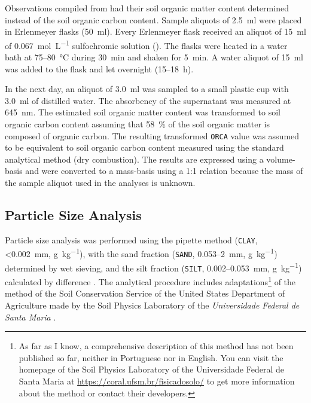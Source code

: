 Observations compiled from \citet{Pedron2005} had their soil organic matter content determined instead of the 
soil organic carbon content. Sample aliquots of \SI{2.5}{\ml} were placed in Erlenmeyer flasks (\SI{50}{\ml}). 
Every Erlenmeyer flask received an aliquot of \SI{15}{\ml} of \SI{0.067}{\mole\per\liter} sulfochromic 
solution (). The flasks were heated in a water bath at 75--\SI{80}{\celsius} during 
\SI{30}{\minute} and shaken for \SI{5}{\minute}. A water aliquot of \SI{15}{\ml} was added to the flask and 
let overnight (15--\SI{18}{\hour}).

In the next day, an aliquot of \SI{3.0}{\ml} was sampled to a small plastic cup with \SI{3.0}{\ml} of 
distilled water. The absorbency of the supernatant was measured at \SI{645}{\nano\metre}. The estimated soil 
organic matter content was transformed to soil organic carbon content assuming that \SI{58}{\percent} of the 
soil organic matter is composed of organic carbon. The resulting transformed \texttt{ORCA} value was assumed 
to be equivalent to soil organic carbon content measured using the standard analytical method (dry 
combustion). The results are expressed using a volume-basis and were converted to a mass-basis using a 1:1 
relation because the mass of the sample aliquot used in the analyses is unknown.

\subsection{Particle Size Analysis}
\label{chap:chap04-granulometry}

\def\footsuzuki{\footnote{As far as I know, a comprehensive description of this method has not been published 
so far, neither in Portuguese nor in English. You can visit the homepage of the Soil Physics Laboratory of the 
Universidade Federal de Santa Maria at \url{https://coral.ufsm.br/fisicadosolo/} to get more information about 
the method or contact their developers.}}

Particle size analysis was performed using the pipette method (\texttt{CLAY}, \SI{<0.002}{\mm}, 
\si{\gram\per\kilo\gram}), with the sand fraction (\texttt{SAND}, 0.053--\SI{2}{\mm}, 
\si{\gram\per\kilo\gram}) determined by wet sieving, and the silt fraction (\texttt{SILT}, 
0.002--\SI{0.053}{\mm}, \si{\gram\per\kilo\gram}) calculated by difference \cite{ClaessenEtAl1997}. The 
analytical procedure includes adaptations\footsuzuki{} of the method of the Soil Conservation Service of the 
United States Department of Agriculture \cite{UnitedStates1972} made by the Soil Physics Laboratory of the 
\textit{Universidade Federal de Santa Maria} \cite{SuzukiEtAl2004, SuzukiEtAl2004a}.


